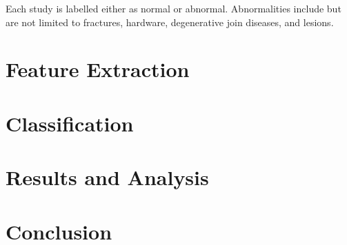 \documentclass{IEEEtran}
\begin{document}
	Each study is labelled either as normal or abnormal. Abnormalities include but are not limited to fractures, hardware, degenerative join diseases, and lesions. 
	
	\section{Feature Extraction}

	
	\section{Classification}
	
	\section{Results and Analysis}
	
	\section{Conclusion}
	
	\clearpage
	
	
\end{document}
